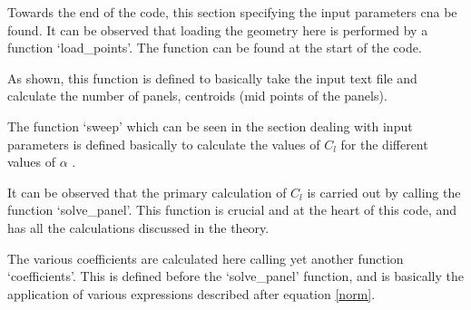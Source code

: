\documentclass[letterpaper,12pt]{article}
\begin{document}


Towards the end of the code, this section specifying the input parameters cna be found. It can be observed that loading the geometry here is performed by a function `load\_points'. The function can be found at the start of the code.

As shown, this function is defined to basically take the input text file and calculate the number of panels, centroids (mid points of the panels).

The function `sweep' which can be seen in the section dealing with input parameters is defined basically to calculate the values of $C_l$ for the different values of $\alpha$ .

It can be observed that the primary calculation of $C_l$ is carried out by calling the function `solve\_panel'. This function is crucial and at the heart of this code, and has all the calculations discussed in the theory.


The various coefficients are calculated here calling yet another function `coefficients'. This is defined before the `solve\_panel' function, and is basically the application of various expressions described after equation \ref{norm}.

\end{document}
